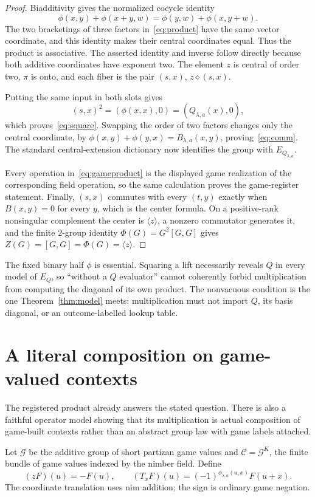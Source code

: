 \documentclass[11pt]{article}
\theoremstyle{definition}
\theoremstyle{remark}
\begin{document}
\begin{proof}
Biadditivity gives the normalized cocycle identity
\[
 \phi(x,y)+\phi(x+y,w)=\phi(y,w)+\phi(x,y+w).
\]
The two bracketings of three factors in~\eqref{eq:product} have the same
vector coordinate, and this identity makes their central coordinates
equal.  Thus the product is associative.  The asserted identity and
inverse follow directly because both additive coordinates have exponent
two.  The element $z$ is central of order two, $\pi$ is onto, and each
fiber is the pair $(s,x)$, $z\diamond(s,x)$.

Putting the same input in both slots gives
\[
 (s,x)^2=(\phi(x,x),0)=(Q_{\lambda,a}(x),0),
\]
which proves~\eqref{eq:square}.  Swapping the order of two factors
changes only the central coordinate, by
$\phi(x,y)+\phi(y,x)=B_{\lambda,a}(x,y)$, proving~\eqref{eq:comm}.
The standard central-extension dictionary now identifies the group with
$E_{Q_{\lambda,a}}$.

Every operation in~\eqref{eq:gameproduct} is the displayed game
realization of the corresponding field operation, so the same calculation
proves the game-register statement.  Finally, $(s,x)$ commutes with every
$(t,y)$ exactly when $B(x,y)=0$ for every $y$, which is the center
formula.  On a positive-rank nonsingular complement the center is
$\langle z\rangle$, a nonzero commutator generates it, and the finite
$2$-group identity $\Phi(G)=G^2[G,G]$ gives
$Z(G)=[G,G]=\Phi(G)=\langle z\rangle$.
\end{proof}

The fixed binary half $\phi$ is essential.  Squaring a lift necessarily
reveals $Q$ in every model of $E_Q$, so ``without a $Q$ evaluator'' cannot
coherently forbid multiplication from computing the diagonal of its own
product.  The nonvacuous condition is the one Theorem~\ref{thm:model}
meets: multiplication must not import $Q$, its basis diagonal, or an
outcome-labelled lookup table.

\section{A literal composition on game-valued contexts}

The registered product already answers the stated question.  There is
also a faithful operator model showing that its multiplication is actual
composition of game-built contexts rather than an abstract group law with
game labels attached.

Let $\mathscr G$ be the additive group of short partizan game values and
$\mathscr C=\mathscr G^K$, the finite bundle of game values indexed by
the nimber field.  Define
\begin{equation}\label{eq:contexts}
 (zF)(u)=-F(u),\qquad
 (T_xF)(u)=(-1)^{\phi_{\lambda,a}(u,x)}F(u+x).
\end{equation}
The coordinate translation uses nim addition; the sign is ordinary game
negation.
\end{document}
